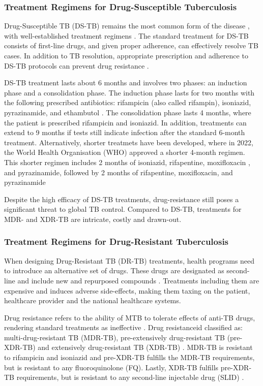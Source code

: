 \subsubsection{Treatment Regimens for Drug-Susceptible Tuberculosis}
Drug-Susceptible TB (DS-TB) remains the most common form of the disease \cite{who2022}, with well-established treatment regimens \cite{whitney2016}. The standard treatment for DS-TB consists of first-line drugs, and given proper adherence, can effectively resolve TB cases. In addition to TB resolution, appropriate prescription and adherence to DS-TB protocols can prevent drug resistance \cite{whitney2016,islam2017drug,khawbung2021, pai2016}. 

DS-TB treatment lasts about 6 months and involves two phases: an induction phase and a consolidation phase. The induction phase lasts for two months with the following prescribed antibiotics: rifampicin (also called rifampin), isoniazid, pyrazinamide, and ethambutol \cite{horsburgh2015}. The consolidation phase lasts 4 months, where the patient is prescribed rifampicin and isoniazid. In addition, treatments can extend to 9 months if tests still indicate infection after the standard 6-month treatment. Alternatively, shorter treatmets have been developed, where in 2022, the World Health Organisation (WHO) approved a shorter 4-month regimen. This shorter regimen includes 2 months of isoniazid, rifapentine, moxifloxacin , and pyrazinamide, followed by 2 months of rifapentine, moxifloxacin, and pyrazinamide \cite{queensland_health_2023}

Despite the high efficacy of DS-TB treatments, drug-resistance still poses a significant threat to global TB control. Compared to DS-TB, treatments for MDR- and XDR-TB are intricate, costly and drawn-out.

\subsubsection{Treatment Regimens for Drug-Resistant Tuberculosis}
When designing Drug-Resistant TB (DR-TB) treatments, health programs need to introduce an alternative set of drugs.  These drugs are designated as second-line and include new and repurposed compounds \cite{Heyckendorf2018}. Treatments including them are expensive and induces adverse side-effects, making them taxing on the patient, healthcare provider and the national healthcare systems\cite{whitney2016}. 

Drug resistance refers to the ability of MTB to tolerate effects of anti-TB drugs, rendering standard treatments as ineffective \cite{who2022}. Drug resistanceid  classified as: multi-drug-resistant TB (MDR-TB), pre-extensively drug-resistant TB (pre-XDR-TB) and extensively drug-resistant TB (XDR-TB) \cite{Heyckendorf2018,Viney2100361}. MDR-TB is resistant to rifampicin and isoniazid and pre-XDR-TB fulfills the MDR-TB requirements, but is resistant to any fluoroquinolone (FQ).  Lastly, XDR-TB fulfills pre-XDR-TB requirements, but is resistant to any second-line injectable drug (SLID) \cite{Heyckendorf2018,Viney2100361}.


